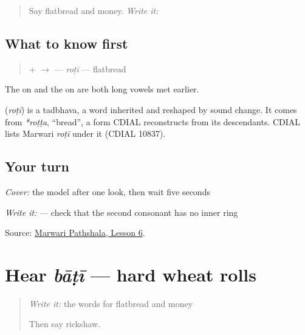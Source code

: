 \label{lesson:MW-C19-roti}



\begin{quote}
Say flatbread and money. \emph{Write it:} \textbf{}
\end{quote}

\subsection*{What to know first}
\begin{quote}
\textbf{} + \textbf{} $\to$ \textbf{} — \emph{roṭī} — flatbread
\end{quote}

The \textbf{} on \textbf{} and the \textbf{} on \textbf{} are both long vowels met earlier.

\begin{cousinweb}
\textbf{} (\emph{roṭī}) is a tadbhava, a word inherited and reshaped by sound change. It comes from \emph{*roṭṭa}, \textquotedblleft{}bread\textquotedblright{}, a form CDIAL reconstructs from its descendants. CDIAL lists Marwari \emph{roṭī} under it (CDIAL 10837).
\end{cousinweb}

\subsection*{Your turn}
\emph{Cover:} the model after one look, then wait five seconds

\emph{Write it:} \textbf{} — check that the second consonant has no inner ring

\begin{tcolorbox}[breakable,colback=teal!4,colframe=teal!35!black,title={Before you move on}]
Source: \href{https://www.marwaripathshala.com/marwari-lesson-6-english}{Marwari Pathshala, Lesson 6}.
\end{tcolorbox}
\section[bāṭī]{Hear \emph{bāṭī} — hard wheat rolls}

\label{lesson:MW-C19-hear-baati}



\begin{quote}
\emph{Write it:} the words for flatbread and money

Then say rickshaw.
\end{quote}

